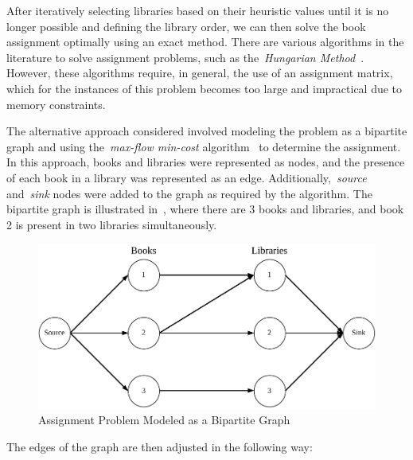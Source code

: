 After iteratively selecting libraries based on their heuristic values until it is
no longer possible and defining the library order, we can then solve the book
assignment optimally using an exact method. There are various algorithms in the
literature to solve assignment problems, such as the~\emph{Hungarian
  Method}~\cite{ramshaw2012minimumcost}. However, these algorithms require, in
general, the use of an assignment matrix, which for the instances of this
problem becomes too large and impractical due to memory constraints.

The alternative approach considered involved modeling the problem as a bipartite
graph and using the~\emph{max-flow min-cost} algorithm~\cite{ramshaw2012minimumcost}
to determine the assignment. In this approach, books and libraries were
represented as nodes, and the presence of each book in a library was represented
as an edge. Additionally,~\emph{source} and~\emph{sink} nodes were added to the
graph as required by the algorithm. The bipartite graph is illustrated
in~, where there are 3 books and libraries, and book 2 is
present in two libraries simultaneously.

\begin{figure}[h]
  \centering
  \includegraphics[width=\textwidth,keepaspectratio]{../assets/bs/bs-graph.pdf}
  \caption{Assignment Problem Modeled as a Bipartite Graph}
  \label{fig:bs-graph}
\end{figure}

The edges of the graph are then adjusted in the following way:


